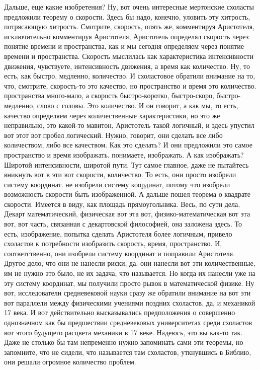 Дальше, еще
какие изобретения? Ну, вот очень интересные мертонские схоласты предложили
теорему о скорости. Здесь бы надо, конечно, уловить эту хитрость, потрясающую
хитрость. Смотрите, скорость, опять же, комментируя Аристотеля, исключительно
комментируя Аристотеля, Аристотель определял скорость через понятие времени и
пространства, как и мы сегодня определяем через понятие времени и пространства.
Скорость мыслилась как характеристика интенсивности движения, чувствуете,
интенсивность движения, а время как количество. Ну, то есть, как быстро,
медленно, количество. И схоластовое обратили внимание на то, что, смотрите,
скорость-то это качество, но пространство и время это количество. пространства
много-мало, а скорость быстро-коротко, быстро-скоро, быстро-медленно, слово с
головы. Это количество. И он говорит, а как мы, то есть, качество определяем
через количественные характеристики, но это же неправильно, это какой-то
мавитон, Аристотель такой логичный, и здесь упустил вот этот вот пробел
логический. Нужно, говорит, они сделать все либо количеством, либо все
качеством. Как это сделать? И они предложили это самое пространство и время
изображать. понимаете, изображать. А как изображать? Широтой интенсивности,
широтой пути. Тут самое главное, даже не пытайтесь вникнуть вот в эти вот
скорости, количество. То есть, они просто изобрели систему координат. не
изобрели систему координат, потому что изобрели возможность скорости быть
изображенной. А дальше пошел теорема о квадрате скорости. Имеется в виду, как
площадь прямоугольника. Весь, по сути дела, Декарт математический, физическая
вот эта вот, физико-математическая вот эта вот, вот часть, связанная с
декартовской философией, она заложена здесь. То есть, изображение, попытка
сделать Аристотеля более логичным, привело схоластов к потребности изобразить
скорость, время, пространство. И, соответственно, они изобрели систему координат
и поправили Аристотеля. Другое дело, что они не нанесли риски, да, они нанесли
вот эти количественные, им не нужно это было, не их задача, что называется. Но
когда их нанесли уже на эту систему координат, мы получили просто рывок в
математической физике. Ну вот, исследователи средневековой науки сразу же
обратили внимание на вот эти вот параллели между физическими учениями поздних
схоластов, да, и механикой 17 века. И вот действительно высказывались
предположения о совершенно однозначном как бы предшествии средневековых
университетах среди схоластов вот этого будущего расцвета механики в 17 веке.
Надеюсь, это вы как-то так. Даже не столько бы там непременно нужно запоминать
сами эти теоремы, но запомните, что не сидели, что называется там схоластов,
уткнувшись в Библию, они решали огромное количество проблем. 

